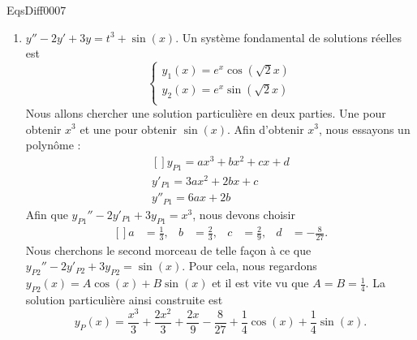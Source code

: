 \begin{corrige}{EqsDiff0007}
\begin{enumerate}
\item
$y''-2y'+3y=t^3+\sin(x)$. Un système fondamental de solutions réelles est
\begin{equation}
	\left\{
\begin{array}{ll}
y_1(x)=e^x\cos(\sqrt{2}x)\\
y_2(x)=e^x\sin(\sqrt{2}x)\\
\end{array}
\right.
\end{equation}
Nous allons chercher une solution particulière en deux parties. Une pour obtenir $x^3$ et une pour obtenir $\sin(x)$. Afin d'obtenir $x^3$, nous essayons un polynôme :
\begin{equation}
	\begin{aligned}[]
		y_{P1}=ax^3+bx^2+cx+d\\
		y'_{P1}=3ax^2+2bx+c\\
		y''_{P1}=6ax+2b
	\end{aligned}
\end{equation}
Afin que $y_{P1}''-2y'_{P1}+3y_{P1}=x^3$, nous devons choisir
\begin{equation}
	\begin{aligned}[]
		a&=\frac{1}{ 3 },&b&=\frac{ 2 }{ 3 },&c&=\frac{ 2 }{ 9 },&d&=-\frac{ 8 }{ 27 }.
	\end{aligned}
\end{equation}
Nous cherchons le second morceau de telle façon à ce que $y_{P2}''-2y'_{P2}+3y_{P2}=\sin(x)$. Pour cela, nous regardons $y_{P2}(x)=A\cos(x)+B\sin(x)$ et il est vite vu que $A=B=\frac{1}{ 4 }$. La solution particulière ainsi construite est
\begin{equation}
	y_P(x)=\frac{ x^3 }{ 3 }+\frac{ 2x^2 }{ 3 }+\frac{ 2x }{ 9 }-\frac{ 8 }{ 27 }+\frac{1}{ 4 }\cos(x)+\frac{1}{ 4 }\sin(x).
\end{equation}





\end{enumerate}


\end{corrige}

